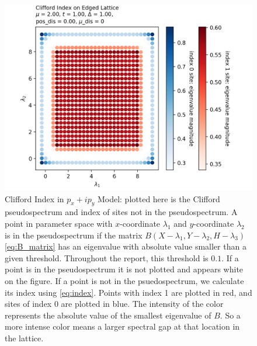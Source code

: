 \documentclass[a4paper]{article}
\begin{document}
\begin{figure}
\centering
\includegraphics[width=.9\textwidth]{figures/pxipy_clifford.png}
\caption{Clifford Index in $p_x + ip_y$ Model: plotted here is the Clifford pseudospectrum and index of sites not in the pseudospectrum.
A point in parameter space with $x$-coordinate $\lambda_1$ and $y$-coordinate $\lambda_2$ is in the pseudospectrum if the matrix $B(X - \lambda_1, Y - \lambda_2, H - \lambda_3)$ \eqref{eq:B_matrix} has an eigenvalue with absolute value smaller than a given threshold.
Throughout the report, this threshold is $0.1$.
If a point is in the pseudospectrum it is not plotted and appears white on the figure.
If a point is not in the psuedospectrum, we calculate its index using \eqref{eq:index}.
Points with index 1 are plotted in red, and sites of index 0 are plotted in blue.
The intensity of the color represents the absolute value of the smallest eigenvalue of $B$.
So a more intense color means a larger spectral gap at that location in the lattice.
}
\label{fig:pxipy_index}%
\end{figure}
\end{document}
